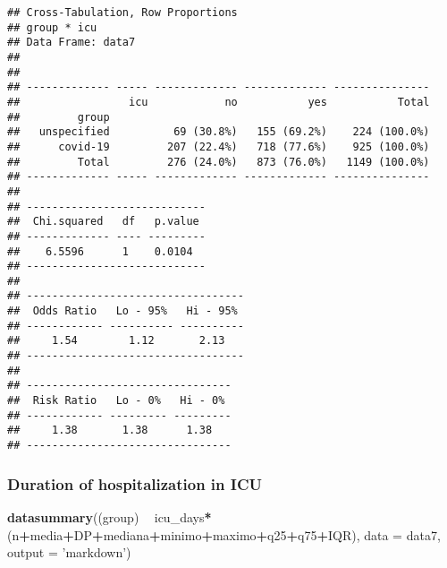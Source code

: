 \documentclass[
]{article}
\newenvironment{Shaded}{\begin{snugshade}}{\end{snugshade}}
\newcommand{\DataTypeTok}[1]{\textcolor[rgb]{0.13,0.29,0.53}{#1}}
\newcommand{\KeywordTok}[1]{\textcolor[rgb]{0.13,0.29,0.53}{\textbf{#1}}}
\newcommand{\NormalTok}[1]{#1}
\newcommand{\OperatorTok}[1]{\textcolor[rgb]{0.81,0.36,0.00}{\textbf{#1}}}
\newcommand{\StringTok}[1]{\textcolor[rgb]{0.31,0.60,0.02}{#1}}
\begin{document}
\begin{verbatim}
## Cross-Tabulation, Row Proportions  
## group * icu  
## Data Frame: data7  
## 
## 
## ------------- ----- ------------- ------------- ---------------
##                 icu            no           yes           Total
##         group                                                  
##   unspecified          69 (30.8%)   155 (69.2%)    224 (100.0%)
##      covid-19         207 (22.4%)   718 (77.6%)    925 (100.0%)
##         Total         276 (24.0%)   873 (76.0%)   1149 (100.0%)
## ------------- ----- ------------- ------------- ---------------
## 
## ----------------------------
##  Chi.squared   df   p.value 
## ------------- ---- ---------
##    6.5596      1    0.0104  
## ----------------------------
## 
## ----------------------------------
##  Odds Ratio   Lo - 95%   Hi - 95% 
## ------------ ---------- ----------
##     1.54        1.12       2.13   
## ----------------------------------
## 
## --------------------------------
##  Risk Ratio   Lo - 0%   Hi - 0% 
## ------------ --------- ---------
##     1.38       1.38      1.38   
## --------------------------------
\end{verbatim}

\hypertarget{duration-of-hospitalization-in-icu}{%
\subsubsection{Duration of hospitalization in
ICU}\label{duration-of-hospitalization-in-icu}}

\begin{Shaded}
\end{Shaded}

\begin{Shaded}
\begin{Highlighting}[]
\KeywordTok{datasummary}\NormalTok{((group) }\OperatorTok{~}\StringTok{ }\NormalTok{icu_days}\OperatorTok{*}\NormalTok{(n}\OperatorTok{+}\NormalTok{media}\OperatorTok{+}\NormalTok{DP}\OperatorTok{+}\NormalTok{mediana}\OperatorTok{+}\NormalTok{minimo}\OperatorTok{+}\NormalTok{maximo}\OperatorTok{+}\NormalTok{q25}\OperatorTok{+}\NormalTok{q75}\OperatorTok{+}\NormalTok{IQR),}
            \DataTypeTok{data =}\NormalTok{ data7, }\DataTypeTok{output =} \StringTok{'markdown'}\NormalTok{)}
\end{Highlighting}
\end{Shaded}
\end{document}
